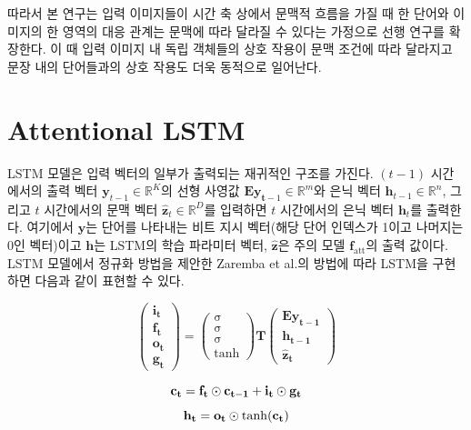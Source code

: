 \documentclass{kcc}
\newcommand{\vy}[0]{\mathbf{y}}
\newcommand{\vh}[0]{\mathbf{h}}
\newcommand{\vt}[0]{\mathbf{t}}
\newcommand{\vz}[0]{\mathbf{z}}
\newcommand{\mE}[0]{\mathbf{E}}
\begin{document}
따라서 본 연구는 입력 이미지들이 시간 축 상에서 문맥적 흐름을 가질 때 한 단어와 이미지의 한 영역의 대응 관계는 문맥에 따라 달라질 수 있다는 가정으로 선행 연구를 확장한다. 이 때 입력 이미지 내 독립 객체들의 상호 작용이 문맥 조건에 따라 달라지고 문장 내의 단어들과의 상호 작용도 더욱 동적으로 일어난다. 

\section{Attentional LSTM}

LSTM 모델은 입력 벡터의 일부가 출력되는 재귀적인 구조를 가진다. $(t-1)$ 시간에서의 출력 벡터 $\vy_{t-1} \in \mathbb{R}^K$의 선형 사영값 $\mE\vy_{\vt-1} \in \mathbb{R}^m$와 은닉 벡터 $\vh_{t-1} \in \mathbb{R}^n$, 그리고 $t$ 시간에서의 문맥 벡터 $\hat{\vz}_t \in \mathbb{R}^D$를 입력하면 $t$ 시간에서의 은닉 벡터 $\vh_t$를 출력한다. 여기에서 $\vy$는 단어를 나타내는 비트 지시 벡터(해당 단어 인덱스가 1이고 나머지는 0인 벡터)이고 $\vh$는 LSTM의 학습 파라미터 벡터, $\hat{\vz}$은 주의 모델 $\mathbf{f}_{\text{att}}$의 출력 값이다. LSTM 모델에서 정규화 방법을 제안한 Zaremba et al.\cite{Zaremba2015}의 방법에 따라 LSTM을 구현하면 다음과 같이 표현할 수 있다.

\begin{equation}
\begin{pmatrix}\mathbf{i_{t}}\\\mathbf{f_{t}}\\\mathbf{o_{t}}\\\mathbf{g_{t}}\end{pmatrix} =
  \begin{pmatrix}\mathrm{\sigma}\\\mathrm{\sigma}\\\mathrm{\sigma}\\\tanh\end{pmatrix}
  \mathbf{T}
  \begin{pmatrix}\mathbf{Ey_{t-1}}\\\mathbf{h_{t-1}}\\\mathbf{\hat{z}_t}\end{pmatrix}
\end{equation}

\begin{equation}
\mathbf{c_t} = \mathbf{f_t} \odot \mathbf{c_{t-1}} + \mathbf{i_t} \odot \mathbf{g_t}\\
\end{equation}
\begin{equation}
\label{eq3}
\mathbf{h_t} = \mathbf{o_t} \odot \tanh(\mathbf{c_t})\\
\end{equation}
\end{document}
